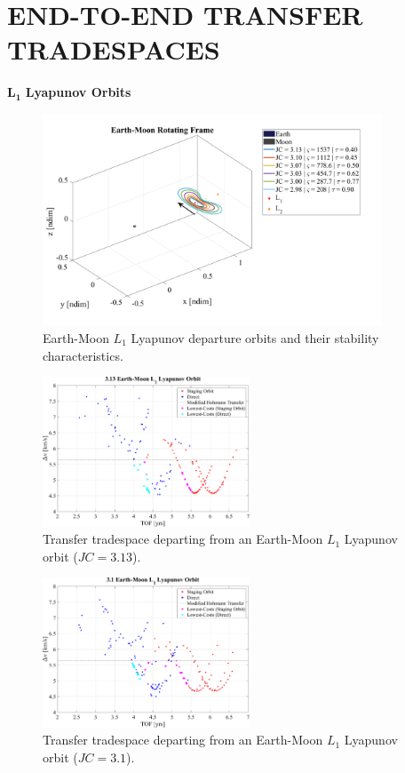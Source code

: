 \chapter{END-TO-END TRANSFER TRADESPACES}

$\pmb{L_{1}}$ \textbf{Lyapunov Orbits}
\begin{figure}[ht]
    \centering
    \includegraphics[width=0.9\textwidth]{figures/L1LyapunovDepartureOrbits.pdf}
    \caption{Earth-Moon $L_{1}$ Lyapunov departure orbits and their stability characteristics.}
\end{figure}

\begin{figure}[ht]
    \centering
    \includegraphics[width=0.55\textwidth]{figures/TradeSpace_L1Lyapunov_3_13.pdf}
    \caption{Transfer tradespace departing from an Earth-Moon $L_{1}$ Lyapunov orbit ($JC=3.13$).}
\end{figure}

\begin{figure}[ht]
    \centering
    \includegraphics[width=0.55\textwidth]{figures/TradeSpace_L1Lyapunov_3_10.pdf}
    \caption{Transfer tradespace departing from an Earth-Moon $L_{1}$ Lyapunov orbit ($JC=3.1$).}
\end{figure}

